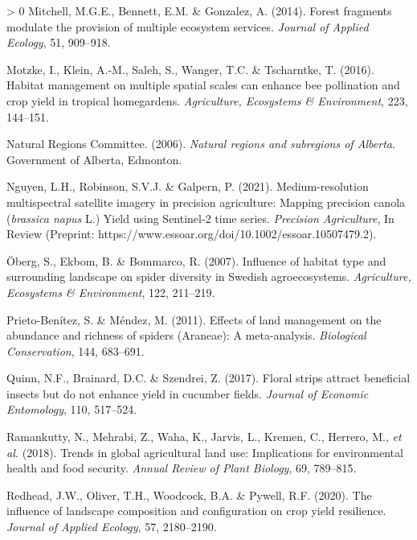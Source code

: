 \documentclass[]{elsarticle} %
\newlength{\cslhangindent}
\newenvironment{CSLReferences}[3] %
 {%
  \setlength{\parindent}{0pt}
  \ifodd #1 \everypar{\setlength{\hangindent}{\cslhangindent}}\ignorespaces\fi
  \ifnum #2 > 0
  \setlength{\parskip}{#2\baselineskip}
  \fi
 }%
 {}
\begin{document}
\begin{CSLReferences}{1}{0}
\leavevmode\hypertarget{ref-mitchell2014}{}%
Mitchell, M.G.E., Bennett, E.M. \& Gonzalez, A. (2014). Forest fragments modulate the provision of multiple ecosystem services. \emph{Journal of Applied Ecology}, 51, 909--918.

\leavevmode\hypertarget{ref-motzke2016}{}%
Motzke, I., Klein, A.-M., Saleh, S., Wanger, T.C. \& Tscharntke, T. (2016). Habitat management on multiple spatial scales can enhance bee pollination and crop yield in tropical homegardens. \emph{Agriculture, Ecosystems \& Environment}, 223, 144--151.

\leavevmode\hypertarget{ref-ABRegions2006}{}%
Natural Regions Committee. (2006). \emph{Natural regions and subregions of {Alberta}}. Government of Alberta, Edmonton.

\leavevmode\hypertarget{ref-nguyen2021}{}%
Nguyen, L.H., Robinson, S.V.J. \& Galpern, P. (2021). Medium-resolution multispectral satellite imagery in precision agriculture: Mapping precision canola (\emph{brassica napus} {L.}) Yield using {Sentinel-2} time series. \emph{Precision Agriculture}, In Review (Preprint: https://www.essoar.org/doi/10.1002/essoar.10507479.2).

\leavevmode\hypertarget{ref-oberg2007}{}%
Öberg, S., Ekbom, B. \& Bommarco, R. (2007). Influence of habitat type and surrounding landscape on spider diversity in {Swedish} agroecosystems. \emph{Agriculture, Ecosystems {\&} Environment}, 122, 211--219.

\leavevmode\hypertarget{ref-prietoBenitez2011}{}%
Prieto-Benítez, S. \& Méndez, M. (2011). Effects of land management on the abundance and richness of spiders ({Araneae}): A meta-analysis. \emph{Biological Conservation}, 144, 683--691.

\leavevmode\hypertarget{ref-quinn2017}{}%
Quinn, N.F., Brainard, D.C. \& Szendrei, Z. (2017). Floral strips attract beneficial insects but do not enhance yield in cucumber fields. \emph{Journal of Economic Entomology}, 110, 517--524.

\leavevmode\hypertarget{ref-ramankutty2018}{}%
Ramankutty, N., Mehrabi, Z., Waha, K., Jarvis, L., Kremen, C., Herrero, M., \emph{et al.} (2018). Trends in global agricultural land use: Implications for environmental health and food security. \emph{Annual Review of Plant Biology}, 69, 789--815.

\leavevmode\hypertarget{ref-redhead2020}{}%
Redhead, J.W., Oliver, T.H., Woodcock, B.A. \& Pywell, R.F. (2020). The influence of landscape composition and configuration on crop yield resilience. \emph{Journal of Applied Ecology}, 57, 2180--2190.


\end{CSLReferences}
\end{document}
